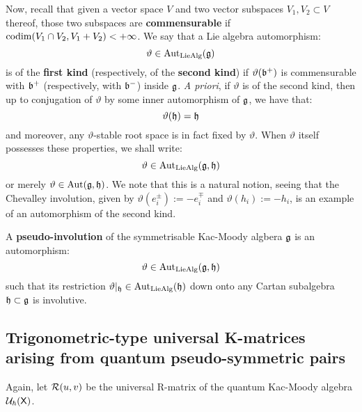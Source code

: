         Now, recall that given a vector space $V$ and two vector subspaces $V_1, V_2 \subset V$ thereof, those two subspaces are \textbf{commensurable} if $\operatorname{codim}(V_1 \cap V_2, V_1 + V_2) < +\infty$. We say that a Lie algebra automorphism:
            $$\vartheta \in \operatorname{Aut}_{\mathrm{Lie}\mathrm{Alg}}(\mathfrak{g})$$
        is of the \textbf{first kind} (respectively, of the \textbf{second kind}) if $\vartheta(\mathfrak{b}^+)$ is commensurable with $\mathfrak{b}^+$ (respectively, with $\mathfrak{b}^-$) inside $\mathfrak{g}$. \textit{A priori}, if $\vartheta$ is of the second kind, then up to conjugation of $\vartheta$ by some inner automorphism of $\mathfrak{g}$, we have that:
            $$\vartheta(\mathfrak{h}) = \mathfrak{h}$$
        and moreover, any $\vartheta$-stable root space is in fact fixed by $\vartheta$. When $\vartheta$ itself possesses these properties, we shall write:
            $$\vartheta \in \operatorname{Aut}_{\mathrm{Lie}\mathrm{Alg}}(\mathfrak{g}, \mathfrak{h})$$
        or merely $\vartheta \in \operatorname{Aut}(\mathfrak{g}, \mathfrak{h})$. We note that this is a natural notion, seeing that the Chevalley involution, given by $\vartheta(e_i^{\pm}) := -e_i^{\mp}$ and $\vartheta(h_i) := -h_i$, is an example of an automorphism of the second kind. 
        \begin{definition} \label{def: pseudo_involutions}
            A \textbf{pseudo-involution} of the symmetrisable Kac-Moody algbera $\mathfrak{g}$ is an automorphism:
                $$\vartheta \in \operatorname{Aut}_{\mathrm{Lie}\mathrm{Alg}}(\mathfrak{g}, \mathfrak{h})$$
            such that its restriction $\vartheta|_{\mathfrak{h}} \in \operatorname{Aut}_{\mathrm{Lie}\mathrm{Alg}}(\mathfrak{h})$ down onto any Cartan subalgebra $\mathfrak{h} \subset \mathfrak{g}$ is involutive. 
        \end{definition}

    

    \subsection{Trigonometric-type universal K-matrices arising from quantum pseudo-symmetric pairs}
        Again, let $\mathcal{R}(u, v)$ be the universal R-matrix of the quantum Kac-Moody algebra $\mathcal{U}_{\hbar}(\mathsf{X})$.

